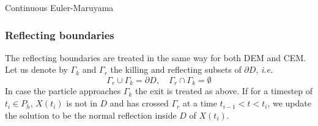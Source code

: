 \begin{algorithm}[t]
\caption{Continuous Euler-Maruyama}
\label{alg:algoCEM}
\end{algorithm}

\subsubsection{Reflecting boundaries}
The reflecting boundaries are treated in the same way for both DEM and CEM. Let us denote by $\Gamma_k$ and $\Gamma_r$ the killing and reflecting subsets of $\partial D$, \textit{i.e.}
\begin{equation}\label{eq:Boundaries}
	\Gamma_r \cup \Gamma_k = \partial D, \quad \Gamma_r \cap \Gamma_k = \emptyset
\end{equation} 
In case the particle approaches $\Gamma_k$ the exit is treated as above. If for a timestep of $t_i \in P_h$, $X(t_i)$ is not in $D$ and has crossed $\Gamma_r$ at a time $t_{i-1} < t < t_i$, we update the solution to be the normal reflection inside $D$ of $X(t_i)$.




